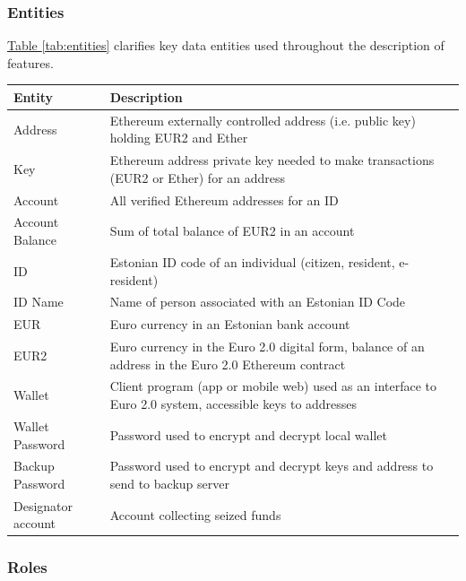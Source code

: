 \documentclass[12pt]{article} %
\newcommand{\hypertableref}[1]{\hyperref[#1]{Table \ref{#1}}}
\begin{document}
{{\subsubsection{Entities} \label{sssec:3.3:entities}

\hypertableref{tab:entities} clarifies key data entities used throughout the description of features.

\begin{center}
\begin{tabular}{ | p{3cm} | p{12cm} | }
 \hline
 Entity & Description
 \\ \hline\hline
 Address & Ethereum externally controlled address (i.e. public key) holding EUR2 and Ether
 \\ \hline
 Key & Ethereum address private key needed to make transactions (EUR2 or Ether) for an address
 \\ \hline
 Account & All verified Ethereum addresses for an ID
 \\ \hline
 Account Balance & Sum of total balance of EUR2 in an account
 \\ \hline
 ID & Estonian ID code of an individual (citizen, resident, e-resident)
 \\ \hline
 ID Name & Name of person associated with an Estonian ID Code
 \\ \hline
 EUR & Euro currency in an Estonian bank account
 \\ \hline
 EUR2 & Euro currency in the Euro 2.0 digital form, balance of an address in the Euro 2.0 Ethereum contract
 \\ \hline
 Wallet & Client program (app or mobile web) used as an interface to Euro 2.0 system, accessible keys to addresses
 \\ \hline
 Wallet Password & Password used to encrypt and decrypt local wallet
 \\ \hline
 Backup Password & Password used to encrypt and decrypt keys and address to send to backup server
 \\ \hline
 Designator account & Account collecting seized funds
 \\ \hline
\end{tabular}
\end{center}
\label{tab:entities}

\subsubsection{Roles} \label{sssec:3.3:roles}

}}
\end{document}
